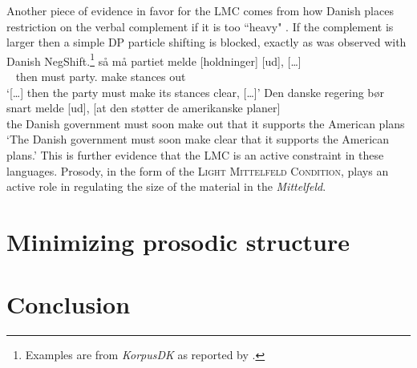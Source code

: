 \documentclass[12pt, letterpaper]{article}
\begin{document}
Another piece of evidence in favor for the LMC comes from how Danish places restriction on the verbal complement if it is too ``heavy" \citep[44f]{mullerDanishHeadDrivenPhraseInpreparation}. If the complement is larger then a simple DP particle shifting is blocked, exactly as was observed with Danish NegShift.\footnote{Examples are from \emph{KorpusDK} as reported by \citet{mullerDanishHeadDrivenPhraseInpreparation}.} 
	\ea \gll {[…]} så må partiet melde [holdninger] [ud], {[…]}\\
	~ then must party.\Def{} make stances out\\
	\glt `{[…]} then the party must make its stances clear, {[…]}'
	\ex \gll Den danske regering bør snart melde [ud], [at den støtter de amerikanske planer]\\
	the Danish government must soon make out that it supports the American plans\\
	\glt `The Danish government must soon make clear that it supports the American plans.'
	\z 
This is further evidence that the LMC is an active constraint in these languages. Prosody, in the form of the \textsc{Light Mittelfeld Condition}, plays an active role in regulating the size of the material in the \emph{Mittelfeld}.

\section{Minimizing prosodic structure} \label{sec:PF}



\section{Conclusion} \label{sec:Conclusion}


\printbibliography[heading=bibintoc]
\end{document}
